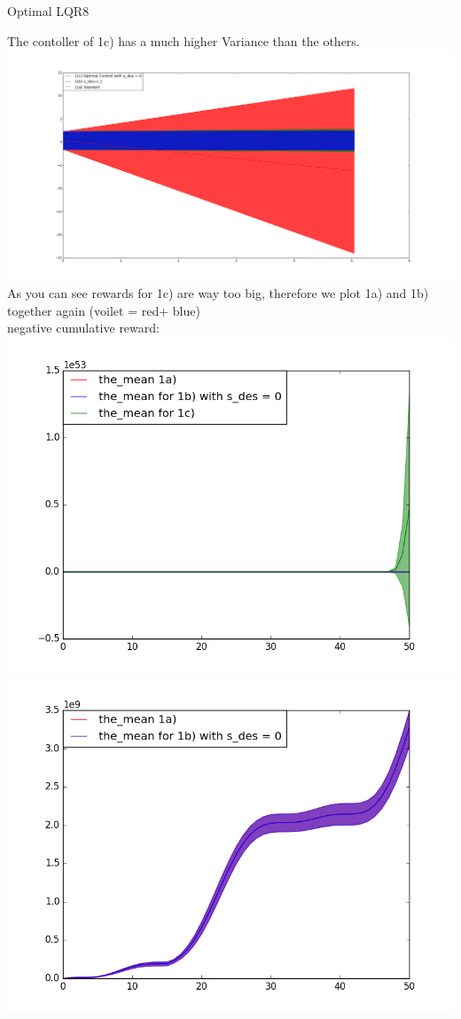 \begin{questions}
\begin{question}{Optimal LQR}{8}
\begin{answer}
The contoller of 1c) has a much higher Variance than the others.\\
\includegraphics[scale=0.35,trim=70mm 0mm 0mm 0mm,clip=true]{states_c2.png}
As you can see rewards for 1c) are way too big, therefore we plot 1a) and 1b) together again (voilet = red+ blue)\\
negative cumulative reward:\\
\includegraphics[scale=0.35,trim=0mm 0mm 0mm 0mm,clip=true]{rewards_c.png}
\includegraphics[scale=0.35,trim=0mm 0mm 0mm 0mm,clip=true]{rewards_c2.png}\newpage

\end{answer}


\end{question}
\end{questions}
